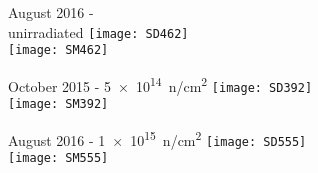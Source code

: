 \begin{frame}
	\centering
	\begin{minipage}{3.1cm}
		\centering
		August 2016 - \\unirradiated
		\texttt{[image: SD462]}\\
		\texttt{[image: SM462]}
	\end{minipage}
	\hspace*{2pt}
	\begin{minipage}{3.1cm}
		\centering
		October 2015 - \SI[exponent-product = \cdot]{5e14}{n/cm^{2}}
		\texttt{[image: SD392]}\\
		\texttt{[image: SM392]}
	\end{minipage}
	\hspace*{2pt}
	\begin{minipage}{3.1cm}
		\centering
		August 2016 - \SI[exponent-product = \cdot]{1e15}{n/cm^{2}}
		\texttt{[image: SD555]}\\
		\texttt{[image: SM555]}
	\end{minipage}\s
\end{frame}

